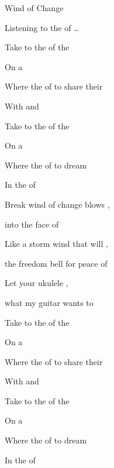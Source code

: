 \begin{SBSong}{Wind of Change}
\begin{SBVerse}
    Listening to the  of \ldots{} 
  \end{SBVerse}
  \CBPageBrk
  \begin{SBChorus}
     Take  to the  of the 

    On a  

    Where the  of to share their 

    With  and 
  \end{SBChorus}
  \begin{SBChorus} 
     Take  to the  of the 

    On a  

    Where the  of to dream 

    In the  of 
  \end{SBChorus}
  \begin{SBBracket}{Break}
     wind of change blows ,

    into the face of 

    Like a storm wind that will ,

    the freedom bell for peace of 

    Let your ukulele ,

    what my guitar wants to  
  \end{SBBracket}
  \begin{SBChorus} 
     Take  to the  of the 

    On a  

    Where the  of to share their 

    With  and 
  \end{SBChorus}
  \begin{SBChorus} 
     Take  to the  of the 

    On a  

    Where the  of to dream 

    In the  of    
  \end{SBChorus}
\end{SBSong}